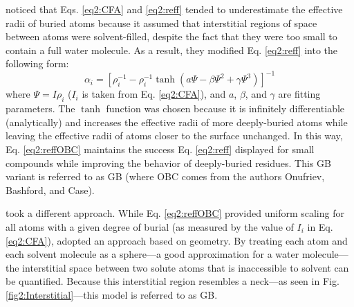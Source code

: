 \citeauthor{Onufriev_Proteins_2004_v55_p383} noticed that Eqs. \ref{eq2:CFA} and
\ref{eq2:reff} tended to underestimate the effective radii of buried atoms
because it assumed that interstitial regions of space between atoms were
solvent-filled, despite the fact that they were too small to contain a full
water molecule. \cite{Onufriev_Proteins_2004_v55_p383} As a result, they
modified Eq. \ref{eq2:reff} into the following form:
\begin{equation}
   \alpha _ i = \left[ \rho _ i ^ {-1} - \rho _ i ^ {-1} \tanh \left( a
   \Psi - \beta \Psi^2 + \gamma \Psi^3 \right) \right] ^ {-1}
   \label{eq2:reffOBC}
\end{equation}
where $\Psi = I \rho_i$ ($I_i$ is taken from Eq. \ref{eq2:CFA}), and $a$,
$\beta$, and $\gamma$ are fitting parameters. The $\tanh$ function was chosen
because it is infinitely differentiable (analytically) and increases the
effective radii of more deeply-buried atoms while leaving the effective radii of
atoms closer to the surface unchanged. In this way, Eq. \ref{eq2:reffOBC}
maintains the success Eq. \ref{eq2:reff} displayed for small compounds while
improving the behavior of deeply-buried residues.
\cite{Onufriev_Proteins_2004_v55_p383} This GB variant is referred to as
GB (where OBC comes from the authors Onufriev, Bashford, and Case).

\citeauthor{Mongan_JChemTheoryComput_2007_v3_p156} took a different approach.
While Eq. \ref{eq2:reffOBC} provided uniform scaling for all atoms with a given
degree of burial (as measured by the value of $I_i$ in Eq. \ref{eq2:CFA}),
\citeauthor{Mongan_JChemTheoryComput_2007_v3_p156} adopted an approach based on
geometry. By treating each atom and each solvent molecule as a sphere---a good
approximation for a water molecule---the interstitial space between two solute
atoms that is inaccessible to solvent can be quantified. Because this
interstitial region resembles a neck---as seen in Fig.
\ref{fig2:Interstitial}---this model is referred to as GB.
\cite{Mongan_JChemTheoryComput_2007_v3_p156}

